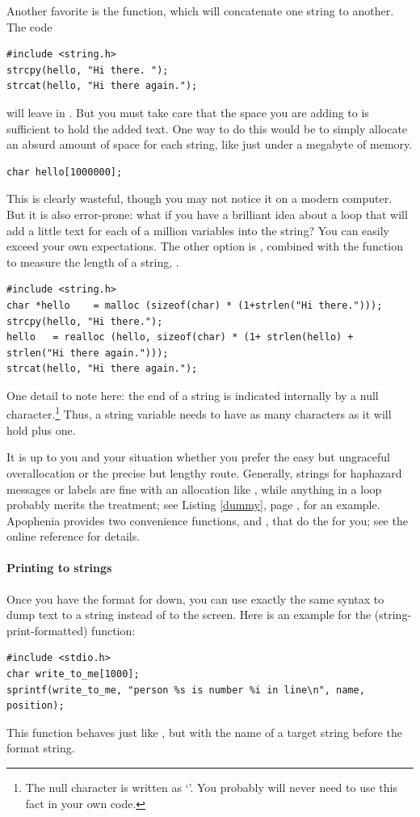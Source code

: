 Another favorite is the  function, which will concatenate one
string to another. The code
\begin{lstlisting}
#include <string.h>
strcpy(hello, "Hi there. "); 
strcat(hello, "Hi there again."); 
\end{lstlisting}
will leave  in . But
you must take care that the space you are adding to is sufficient to
hold the added text. One way to do this would be to simply allocate an
absurd amount of space for each string, like just under a megabyte of
memory.
\begin{lstlisting}
char hello[1000000];
\end{lstlisting}
This is clearly wasteful, though you may not notice it on a modern
computer. But it is also error-prone: what if you have a brilliant idea
about a  loop that will add a little text for each of a
million variables into the string? You can easily exceed your own
expectations. The other option is , combined with the
function to measure the length of a string, .
\begin{lstlisting}
#include <string.h>
char *hello    = malloc (sizeof(char) * (1+strlen("Hi there.")));
strcpy(hello, "Hi there."); 
hello   = realloc (hello, sizeof(char) * (1+ strlen(hello) + strlen("Hi there again.")));
strcat(hello, "Hi there again."); 
\end{lstlisting}
One detail to note here: the end of a string is indicated internally by
a null character.\footnote{The null character is written as
`'. You probably will never need to use this
fact in your own code.} Thus, a string variable needs to have as many
characters as it will hold plus one.

It is up to you and your situation whether you prefer the easy but
ungraceful overallocation or the precise but lengthy 
route. Generally, strings for haphazard messages or labels are fine with 
an allocation like , while anything in a
 loop probably merits the  treatment;
see Listing \ref{dummy}, page \pageref{dummy}, for an example. Apophenia
provides two convenience functions,  and
, that do the  for you; see the
online reference for details.

\paragraph{Printing to strings} Once you have the format for  down, you can use exactly the
same syntax to dump text to a string instead of to the screen. Here is an example for the 
(string-print-formatted) function:
\begin{lstlisting}
#include <stdio.h>
char write_to_me[1000];
sprintf(write_to_me, "person %s is number %i in line\n", name, position);
\end{lstlisting}
This function behaves just like , but with the name of
a target string before the format string. 

